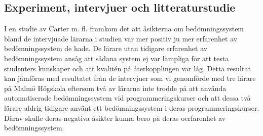 \documentclass[a4paper,11pt]{article}
\begin{document}
{\subsection{Experiment, intervjuer och litteraturstudie}

I en studie av Carter m. fl. \cite{carter} framkom det att åsikterna om bedömningssystem bland de intervjuade lärarna i studien var mer positiv ju mer erfarenhet av bedömningssystem de hade. De lärare utan tidigare erfarenhet av bedömningssystem ansåg att sådana system ej var lämpliga för att testa studenters kunskaper och att kvalitén på återkopplingen var låg. Detta resultat kan jämföras med resultatet från de intervjuer som vi genomförde med tre lärare på Malmö Högskola eftersom två av lärarna inte trodde på att använda automatiserade bedömningssystem vid programmeringskurser och att dessa två lärare aldrig tidigare använt ett bedömningssystem i deras programmeringskurser. Därav skulle deras negativa åsikter kunna bero på deras oerfarenhet av bedömningssystem.

}
\end{document}
